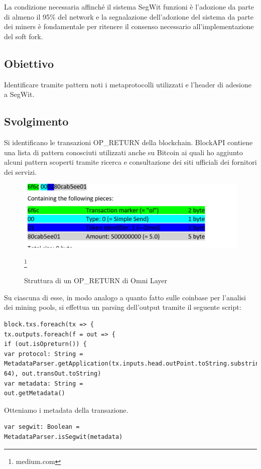La condizione necessaria affinché il sistema SegWit funzioni è l’adozione da parte di almeno il 95\% del network e la segnalazione dell’adozione del sistema da parte dei miners è fondamentale per ritenere il consenso necessario all’implementazione del soft fork.


\subsection{Obiettivo}
Identificare tramite pattern noti i metaprotocolli utilizzati e l’header di adesione a SegWit.
\subsection{Svolgimento}
Si identificano le transazioni OP\_RETURN della blockchain. BlockAPI contiene una lista di pattern conosciuti utilizzati anche su Bitcoin ai quali ho aggiunto alcuni pattern scoperti tramite ricerca e consultazione dei siti ufficiali dei fornitori dei servizi.

\begin{figure}[h]
	\centering
	\includegraphics[width=1.0\linewidth]{images/ol-omnilayer-medium}
	\caption{Struttura di un OP\_RETURN di Omni Layer}
	\label{fig:ol-omnilayer-medium}
	\footnote{medium.com}
\end{figure}

Su ciascuna di esse, in modo analogo a quanto fatto sulle coinbase per l’analisi dei mining pools, si effettua un parsing dell’output tramite il seguente script:

\begin{lstlisting}
block.txs.foreach(tx => {
tx.outputs.foreach(f = out => {
if (out.isOpreturn()) {
var protocol: String =
MetadataParser.getApplication(tx.inputs.head.outPoint.toString.substring(0, 64), out.transOut.toString)
var metadata: String =
out.getMetadata()
\end{lstlisting}

Otteniamo i metadata della transazione.

\begin{lstlisting}
var segwit: Boolean =
MetadataParser.isSegwit(metadata)
\end{lstlisting}

